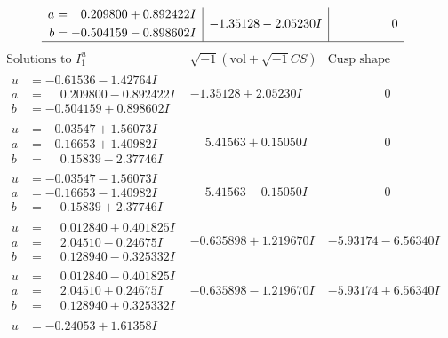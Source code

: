 \documentclass[1p]{elsarticle_modified}
\theoremstyle{definition}
\newcommand{\I}{\sqrt{-1}}
\begin{document}
$$\begin{array}{c|c|c}
\begin{aligned}
a &= \phantom{-}0.209800 + 0.892422 I \\
b &= -0.504159 - 0.898602 I\end{aligned}
 & -1.35128 - 2.05230 I & \phantom{-0.000000 } 0\\
 \hline 
 \end{array}$$\newpage$$\begin{array}{c|c|c}  
\text{Solutions to }I^u_{1}& \I (\text{vol} + \sqrt{-1}CS) & \text{Cusp shape}\\
 \hline 
\begin{aligned}
u &= -0.61536 - 1.42764 I \\
a &= \phantom{-}0.209800 - 0.892422 I \\
b &= -0.504159 + 0.898602 I\end{aligned}
 & -1.35128 + 2.05230 I & \phantom{-0.000000 } 0 \\ \hline\begin{aligned}
u &= -0.03547 + 1.56073 I \\
a &= -0.16653 + 1.40982 I \\
b &= \phantom{-}0.15839 - 2.37746 I\end{aligned}
 & \phantom{-}5.41563 + 0.15050 I & \phantom{-0.000000 } 0 \\ \hline\begin{aligned}
u &= -0.03547 - 1.56073 I \\
a &= -0.16653 - 1.40982 I \\
b &= \phantom{-}0.15839 + 2.37746 I\end{aligned}
 & \phantom{-}5.41563 - 0.15050 I & \phantom{-0.000000 } 0 \\ \hline\begin{aligned}
u &= \phantom{-}0.012840 + 0.401825 I \\
a &= \phantom{-}2.04510 - 0.24675 I \\
b &= \phantom{-}0.128940 - 0.325332 I\end{aligned}
 & -0.635898 + 1.219670 I & -5.93174 - 6.56340 I \\ \hline\begin{aligned}
u &= \phantom{-}0.012840 - 0.401825 I \\
a &= \phantom{-}2.04510 + 0.24675 I \\
b &= \phantom{-}0.128940 + 0.325332 I\end{aligned}
 & -0.635898 - 1.219670 I & -5.93174 + 6.56340 I \\ \hline\begin{aligned}
u &= -0.24053 + 1.61358 I \\

\end{aligned}
\end{array}$$
\end{document}
